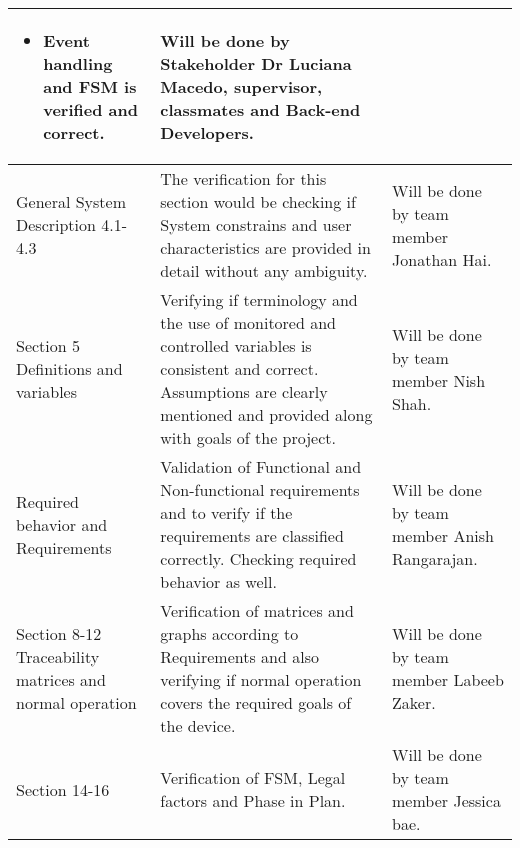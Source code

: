 \documentclass[12pt, titlepage]{article}
\begin{document}
\begin{center}
\begin{tabular}{|m{3cm}|m{8cm}|m{4cm}|}
\begin{itemize}
                                                                                                                                                       \item[\ding{111}] Event handling and FSM is verified and correct.
                                                                                                                                                     \end{itemize}                                                                                & Will be done by Stakeholder Dr Luciana Macedo, supervisor, classmates and Back-end Developers. \\
    \hline
    General System Description 4.1-4.3                      & The verification for this section would be checking if System constrains and user characteristics are provided in detail without any ambiguity.                                       & Will be done by team member Jonathan Hai.                                                    \\
    \hline
    Section 5 Definitions and variables                     & Verifying if terminology and the use of monitored and controlled variables is consistent and correct. Assumptions are clearly mentioned and provided along with goals of the project. & Will be done by team member  Nish Shah.                                                      \\
    \hline
    Required behavior and Requirements                      & Validation of Functional and Non-functional requirements and to verify if the requirements are classified correctly. Checking required behavior as well.                              & Will be done by team member Anish Rangarajan.                                                \\
    \hline
    Section 8-12 Traceability matrices and normal operation & Verification of matrices and graphs according to Requirements and also verifying if normal operation covers the required goals of the device.                                         & Will be done by team member Labeeb Zaker.                                                    \\
    \hline
    Section 14-16                                           & Verification of FSM, Legal factors and Phase in Plan.                                                                                                                                 & Will be done by team member Jessica bae.                                                     \\
    \hline
  \end{tabular}
\end{center}
\end{document}
